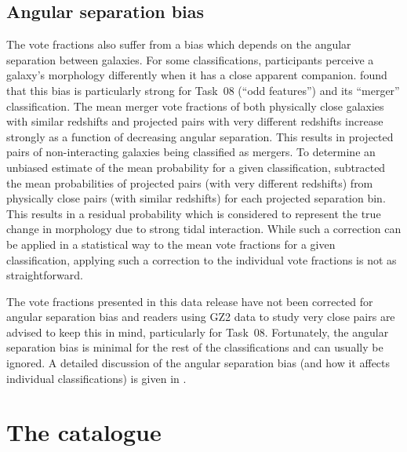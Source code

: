\documentclass[useAMS,usenatbib]{mn2e}
\begin{document}
\subsection{Angular separation bias}\label{ang-bias}

The vote fractions also suffer from a bias which depends on the angular separation between galaxies. For some classifications, participants perceive a galaxy's morphology differently when it has a close apparent companion. \citet{cas13} found that this bias is particularly strong for Task~08 (``odd features'') and its ``merger'' classification. The mean merger vote fractions of both physically close galaxies with similar redshifts and projected pairs with very different redshifts increase strongly as a function of decreasing angular separation. This results in projected pairs of non-interacting galaxies being classified as mergers. To determine an unbiased estimate of the mean probability for a given classification, \citet{cas13} subtracted the mean probabilities of projected pairs (with very different redshifts) from physically close pairs (with similar redshifts) for each projected separation bin. This results in a residual probability which is considered to represent the true change in morphology due to strong tidal interaction. While such a correction can be applied in a statistical way to the mean vote fractions for a given classification, applying such a correction to the individual vote fractions is not as straightforward.

The vote fractions presented in this data release have not been corrected for angular separation bias and readers using GZ2 data to study very close pairs are advised to keep this in mind, particularly for Task~08. Fortunately, the angular separation bias is minimal for the rest of the classifications and can usually be ignored. A detailed discussion of the angular separation bias (and how it affects individual classifications) is given in \citet{cas13}.


\section{The catalogue} \label{sec-catalogue}

\end{document}
